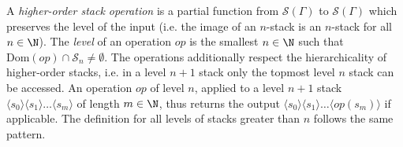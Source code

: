 A {\em higher-order stack operation} is a partial function from $\mathscr{S}(\Gamma)$ 
to $\mathscr{S}(\Gamma)$ which preserves the level of the input (i.e. the image of
an $n$-stack is an $n$-stack for all $n \in \N$). The {\em level } of an operation $op$
is the smallest $n \in \N$ such that $\text{Dom}(op) \cap \mathscr{S}_n \neq \emptyset$. 
The operations 
additionally
 respect the hierarchicality of higher-order stacks, i.e. in
a level $n+1$ stack only the topmost level $n$ stack can be accessed. An operation
$op$ of level $n$, applied to a level $n+1$ stack 
$ \langle s_0 \rangle \langle s_1 \rangle \ldots \langle s_m \rangle$
of length $m \in \N$,
thus
returns the output
$ \langle s_0 \rangle \langle s_1 \rangle \ldots \langle op(s_m) \rangle$
if applicable.
The definition for  all levels of stacks greater than $n$ follows the same pattern.


